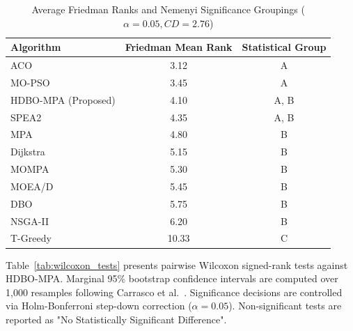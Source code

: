 \documentclass[journal,compsoc]{IEEEtran}
\begin{document}
\begin{table}[!t]
\centering
\caption{Average Friedman Ranks and Nemenyi Significance Groupings ($\alpha = 0.05, CD = 2.76$)}
\label{tab:nemenyi_ranks}
\begin{tabular}{lcc}
\toprule
\textbf{Algorithm} & \textbf{Friedman Mean Rank} & \textbf{Statistical Group} \\
\midrule
ACO~\cite{marche2020how} & 3.12 & A \\
MO-PSO~\cite{al2021multiobjective} & 3.45 & A \\
HDBO-MPA (Proposed) & 4.10 & A, B \\
SPEA2 & 4.35 & A, B \\
MPA~\cite{faramarzi2020marine} & 4.80 & B \\
Dijkstra~\cite{dijkstra2021note} & 5.15 & B \\
MOMPA~\cite{abdelbasset2021multi} & 5.30 & B \\
MOEA/D & 5.45 & B \\
DBO~\cite{xue2022dung} & 5.75 & B \\
NSGA-II & 6.20 & B \\
T-Greedy & 10.33 & C \\
\bottomrule
\end{tabular}
\end{table}

Table~\ref{tab:wilcoxon_tests} presents pairwise Wilcoxon signed-rank tests against HDBO-MPA. Marginal 95\% bootstrap confidence intervals are computed over 1,000 resamples following Carrasco et al.~\cite{carrasco2020recent}. Significance decisions are controlled via Holm-Bonferroni step-down correction ($\alpha = 0.05$). Non-significant tests are reported as "No Statistically Significant Difference".
\end{document}
